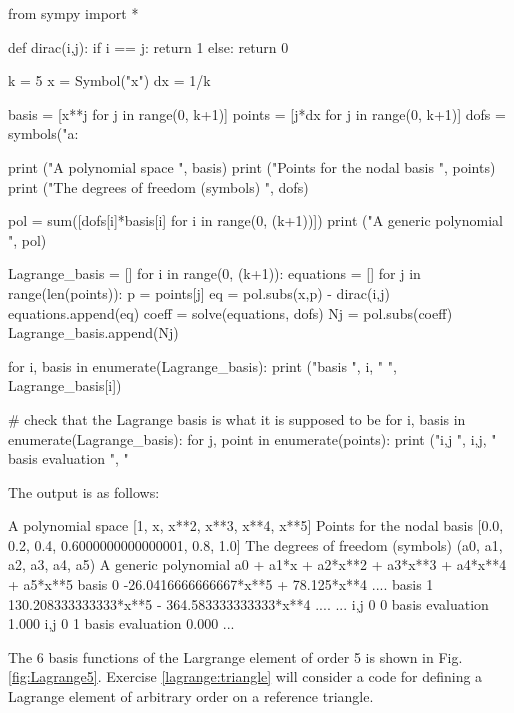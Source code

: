 \begin{python}
from sympy import * 

def dirac(i,j): 
  if i == j: return 1 
  else: return 0 

k = 5  
x = Symbol("x") 
dx = 1/k 

basis = [x**j for j in range(0, k+1)] 
points = [j*dx for j in range(0, k+1)] 
dofs = symbols("a:%

print ("A polynomial space         ", basis) 
print ("Points for the nodal basis ", points) 
print ("The degrees of freedom (symbols) ", dofs) 

pol = sum([dofs[i]*basis[i] for i in range(0, (k+1))])   
print ("A generic polynomial       ", pol)

Lagrange_basis = []
for i in range(0, (k+1)): 
  equations = []
  for j in range(len(points)):  
    p = points[j]
    eq = pol.subs(x,p) - dirac(i,j) 
    equations.append(eq)
  coeff = solve(equations, dofs) 
  Nj = pol.subs(coeff)
  Lagrange_basis.append(Nj) 

for i, basis in enumerate(Lagrange_basis): 
    print ("basis ", i, " ", Lagrange_basis[i]) 

# check that the Lagrange basis is what it is supposed to be 
for i, basis in enumerate(Lagrange_basis): 
    for j, point in enumerate(points): 
        print ("i,j ", i,j, " basis evaluation ",  "%


\end{python}
The output is as follows: 
\begin{python}
A polynomial space          [1, x, x**2, x**3, x**4, x**5]
Points for the nodal basis  [0.0, 0.2, 0.4, 0.6000000000000001, 0.8, 1.0]
The degrees of freedom (symbols)  (a0, a1, a2, a3, a4, a5)
A generic polynomial        a0 + a1*x + a2*x**2 + a3*x**3 + a4*x**4 + a5*x**5
basis  0   -26.0416666666667*x**5 + 78.125*x**4 .... 
basis  1   130.208333333333*x**5 - 364.583333333333*x**4 .... 
...
i,j  0 0  basis evaluation  1.000
i,j  0 1  basis evaluation  0.000
...
\end{python}
The 6 basis functions of the Largrange element of order 5 is shown in Fig. \ref{fig:Lagrange5}. 
Exercise \ref{lagrange:triangle} will consider a code for defining a Lagrange element of arbitrary order on a reference triangle.  

